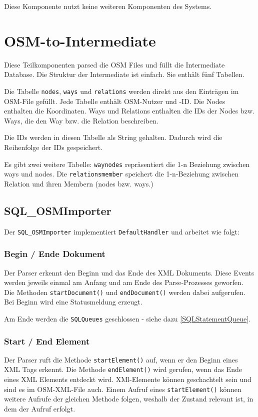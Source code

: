 Diese Komponente nutzt keine weiteren Komponenten des Systems.

\section{OSM-to-Intermediate}
Diese Teilkomponenten parsed die OSM Files und füllt die Intermediate Database.
Die Struktur der Intermediate ist einfach. Sie enthält fünf Tabellen.

Die Tabelle {\tt nodes}, {\tt ways} und {\tt relations} werden direkt aus
den Einträgen im OSM-File gefüllt. Jede Tabelle enthält OSM-Nutzer und -ID.
Die Nodes enthalten die Koordinaten. Ways und Relations enthalten die IDs
der Nodes bzw. Ways, die den Way bzw. die Relation beschreiben.

Die IDs werden in diesen Tabelle als String gehalten. Dadurch wird die
Reihenfolge der IDs gespeichert.

Es gibt zwei weitere Tabelle: {\tt waynodes} repräsentiert die 1-n Beziehung
zwischen ways und nodes. Die {\tt relationsmember} speichert die 1-n-Beziehung 
zwischen Relation und ihren Membern (nodes bzw. ways.)

\subsection{SQL\_OSMImporter}
Der {\tt SQL\_OSMImporter} implementiert {\tt DefaultHandler} und arbeitet wie folgt:

\subsubsection{Begin / Ende Dokument}
Der Parser erkennt den Beginn und das Ende des XML Dokuments. Diese Events werden jeweils
einmal am Anfang und am Ende des Parse-Prozesses geworfen. Die Methoden {\tt startDocument()}
und {\tt endDocument()} werden dabei aufgerufen. Bei Beginn wird eine Statusmeldung erzeugt.

Am Ende werden die {\tt SQLQueues} geschlossen - siehe dazu \ref{SQLStatementQueue}.

\subsubsection{Start / End Element}
Der Parser ruft die Methode {\tt startElement()} auf, wenn er den Beginn eines XML
Tags erkennt. Die Methode {\tt endElement()} wird gerufen, wenn das Ende eines
XML Elements entdeckt wird. XMl-Elemente können geschachtelt sein und sind es im
OSM-XML-File auch. Einem Aufruf eines {\tt startElement()} können weitere Aufrufe
der gleichen Methode folgen, weshalb der Zustand relevant ist, in dem der Aufruf erfolgt.

